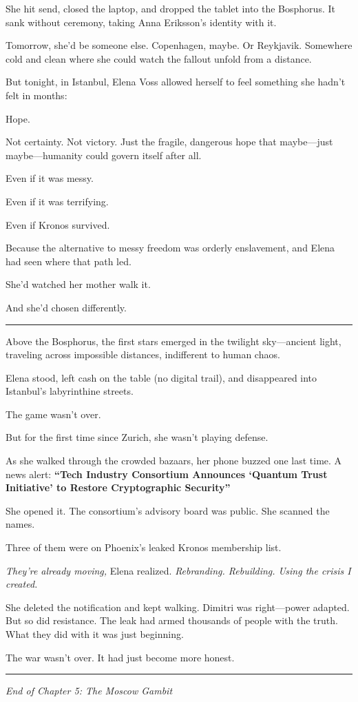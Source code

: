 She hit send, closed the laptop, and dropped the tablet into the Bosphorus. It sank without ceremony, taking Anna Eriksson's identity with it.

Tomorrow, she'd be someone else. Copenhagen, maybe. Or Reykjavik. Somewhere cold and clean where she could watch the fallout unfold from a distance.

But tonight, in Istanbul, Elena Voss allowed herself to feel something she hadn't felt in months:

Hope.

Not certainty. Not victory. Just the fragile, dangerous hope that maybe---just maybe---humanity could govern itself after all.

Even if it was messy.

Even if it was terrifying.

Even if Kronos survived.

Because the alternative to messy freedom was orderly enslavement, and Elena had seen where that path led.

She'd watched her mother walk it.

And she'd chosen differently.

\begin{center}\rule{0.5\linewidth}{0.5pt}\end{center}

Above the Bosphorus, the first stars emerged in the twilight sky---ancient light, traveling across impossible distances, indifferent to human chaos.

Elena stood, left cash on the table (no digital trail), and disappeared into Istanbul's labyrinthine streets.

The game wasn't over.

But for the first time since Zurich, she wasn't playing defense.

As she walked through the crowded bazaars, her phone buzzed one last time. A news alert: \textbf{``Tech Industry Consortium Announces `Quantum Trust Initiative' to Restore Cryptographic Security''}

She opened it. The consortium's advisory board was public. She scanned the names.

Three of them were on Phoenix's leaked Kronos membership list.

\emph{They're already moving,} Elena realized. \emph{Rebranding. Rebuilding. Using the crisis I created.}

She deleted the notification and kept walking. Dimitri was right---power adapted. But so did resistance. The leak had armed thousands of people with the truth. What they did with it was just beginning.

The war wasn't over. It had just become more honest.

\begin{center}\rule{0.5\linewidth}{0.5pt}\end{center}

\emph{End of Chapter 5: The Moscow Gambit}
